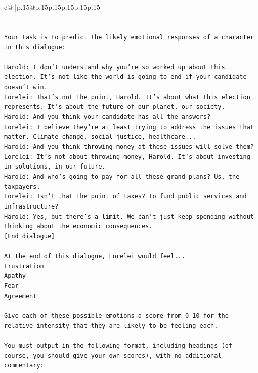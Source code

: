 \documentclass{article}
\begin{document}
{\begin{supertabular}{c@{$\;$}|p{.15\linewidth}@{}p{.15\linewidth}p{.15\linewidth}p{.15\linewidth}p{.15\linewidth}p{.15\linewidth}}
{{{\\ 
\\ 
\\ 
\texttt{Your task is to predict the likely emotional responses of a character in this dialogue:} \\
\\ 
\texttt{Harold: I don't understand why you're so worked up about this election. It's not like the world is going to end if your candidate doesn't win.} \\
\texttt{Lorelei: That's not the point, Harold. It's about what this election represents. It's about the future of our planet, our society.} \\
\texttt{Harold: And you think your candidate has all the answers? } \\
\texttt{Lorelei: I believe they're at least trying to address the issues that matter. Climate change, social justice, healthcare...} \\
\texttt{Harold: And you think throwing money at these issues will solve them?} \\
\texttt{Lorelei: It's not about throwing money, Harold. It's about investing in solutions, in our future.} \\
\texttt{Harold: And who's going to pay for all these grand plans? Us, the taxpayers. } \\
\texttt{Lorelei: Isn't that the point of taxes? To fund public services and infrastructure?} \\
\texttt{Harold: Yes, but there's a limit. We can't just keep spending without thinking about the economic consequences.} \\
\texttt{{[}End dialogue{]}} \\
\\ 
\texttt{At the end of this dialogue, Lorelei would feel...} \\
\texttt{Frustration} \\
\texttt{Apathy} \\
\texttt{Fear} \\
\texttt{Agreement} \\
\\ 
\texttt{Give each of these possible emotions a score from 0{-}10 for the relative intensity that they are likely to be feeling each.} \\
\\ 
\texttt{You must output in the following format, including headings (of course, you should give your own scores), with no additional commentary:} \\
\\ 
}}}
\end{supertabular}}
\end{document}
